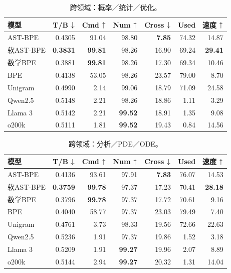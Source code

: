 \begin{table}[H]
\centering\small\renewcommand{\arraystretch}{1.05}
\caption{跨领域：概率／统计／优化。}\label{tab:detail5}
\begin{tabular}{lrrrrrr}\toprule
模型&T/B $\downarrow$&Cmd $\uparrow$&Num $\uparrow$&Cross $\downarrow$&Used&速度 $\uparrow$\\\midrule
AST-BPE & 0.4305 & 91.04 & 98.80 & \textbf{7.85} & 74.32 & 14.87 \\
软AST-BPE & \textbf{0.3831} & \textbf{99.81} & 98.26 & 16.90 & 69.24 & \textbf{29.41} \\
数学BPE & 0.3881 & \textbf{99.81} & 98.26 & 17.30 & 69.34 & 10.46 \\
BPE & 0.4138 & 53.05 & 98.26 & 23.57 & 79.00 & 8.70 \\
Unigram & 0.4990 & 2.14 & 99.06 & 18.79 & 71.09 & 24.58 \\
\midrule
Qwen2.5 & 0.5148 & 2.21 & 98.26 & 18.86 & 1.11 & 3.29 \\
Llama 3 & 0.5142 & 2.21 & \textbf{99.52} & 18.91 & 1.35 & 9.08 \\
o200k & 0.5111 & 1.81 & \textbf{99.52} & 19.43 & 0.84 & 14.56 \\
\bottomrule\end{tabular}
\end{table}

\begin{table}[H]
\centering\small\renewcommand{\arraystretch}{1.05}
\caption{跨领域：分析／PDE／ODE。}\label{tab:detail6}
\begin{tabular}{lrrrrrr}\toprule
模型&T/B $\downarrow$&Cmd $\uparrow$&Num $\uparrow$&Cross $\downarrow$&Used&速度 $\uparrow$\\\midrule
AST-BPE & 0.4136 & 93.61 & 97.91 & \textbf{7.83} & 76.07 & 14.53 \\
软AST-BPE & \textbf{0.3759} & \textbf{99.78} & 97.37 & 17.23 & 70.41 & \textbf{28.18} \\
数学BPE & 0.3796 & \textbf{99.78} & 97.37 & 17.72 & 70.61 & 9.16 \\
BPE & 0.4040 & 58.77 & 97.37 & 23.03 & 79.49 & 7.40 \\
Unigram & 0.4761 & 3.73 & 98.33 & 19.56 & 72.66 & 22.63 \\
\midrule
Qwen2.5 & 0.5236 & 1.91 & 97.37 & 19.86 & 1.52 & 3.18 \\
Llama 3 & 0.5209 & 1.91 & \textbf{99.27} & 19.96 & 2.07 & 8.89 \\
o200k & 0.5144 & 2.94 & \textbf{99.27} & 20.32 & 1.31 & 14.04 \\
\bottomrule\end{tabular}
\end{table}

